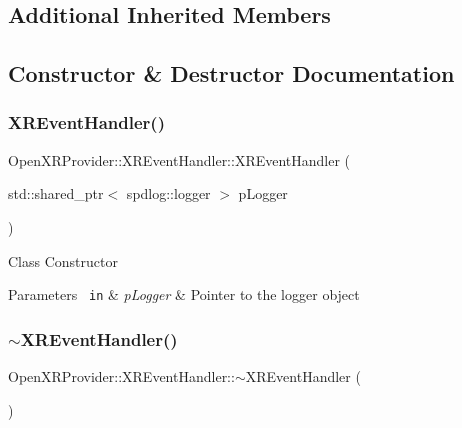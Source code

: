 \subsection*{Additional Inherited Members}


\subsection{Constructor \& Destructor Documentation}
\mbox{\label{class_open_x_r_provider_1_1_x_r_event_handler_a9ffef59d9ec597ceecad19c3fc935ae0}} 
\subsubsection{\texorpdfstring{XREventHandler()}{XREventHandler()}}
{\footnotesize\ttfamily Open\+X\+R\+Provider\+::\+X\+R\+Event\+Handler\+::\+X\+R\+Event\+Handler (\begin{DoxyParamCaption}\item[{std\+::shared\+\_\+ptr$<$ spdlog\+::logger $>$}]{p\+Logger }\end{DoxyParamCaption})}

Class Constructor 
\begin{DoxyParams}[1]{Parameters}
\mbox{\texttt{ in}}  & {\em p\+Logger} & Pointer to the logger object \\
\hline
\end{DoxyParams}
\mbox{\label{class_open_x_r_provider_1_1_x_r_event_handler_a4cc2395d94544372270850eac7eba0ff}} 
\subsubsection{\texorpdfstring{$\sim$XREventHandler()}{~XREventHandler()}}
{\footnotesize\ttfamily Open\+X\+R\+Provider\+::\+X\+R\+Event\+Handler\+::$\sim$\+X\+R\+Event\+Handler (\begin{DoxyParamCaption}{ }\end{DoxyParamCaption})}



